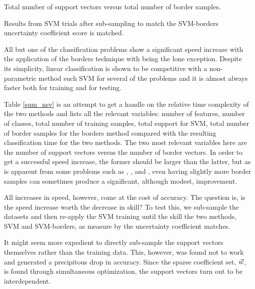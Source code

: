\label{discussion}

\begin{table}
	\caption{Total number of support vectors versus total number of border samples.}
	
	\label{sum_nsv}
\end{table}

\begin{table}
  \caption{Results from SVM trials after sub-sampling to match the SVM-borders
	  uncertainty coefficient score is matched.}
  \label{subsampling_table}
  {\small
    
  }
\end{table}

All but one of the classification problems show a significant speed increase with the application
of the borders technique with  being the lone exception.
Despite its simplicity, linear classification is shown to be competitive with
a non-parametric method such SVM for several of the problems and it is almost 
always faster both for training and for testing.

Table \ref{sum_nsv} is an attempt to get a handle on the relative time complexity 
of the two methods and lists all the relevant variables: number of features,
number of classes, total number of training samples, total support for SVM,
total number of border samples for the borders method compared with the resulting
classification time for the two methods. The two most relevant variables here are the
number of support vectors versus the number of border vectors.
In order to get a successful speed increase, the former should be larger than 
the latter, but as is apparent from some problems such as , , and ,
even having slightly more border samples can sometimes produce a significant,
although modest, improvement.

All increases in speed, however, come at the cost of accuracy.
The question is, is the speed increase worth the decrease in skill?
To test this, we sub-sample the datasets and then re-apply the SVM training
until the skill the two methods, SVM and SVM-borders, as measure by
the uncertainty coefficient matches.

It might seem more expedient to directly sub-sample the support vectors themselves
rather than the training data.
This, however, was found not to work and generated a precipitous drop in accuracy. 
Since the sparse coefficient set, $\vec {w}$, is found through simultaneous 
optimization, the support vectors turn out to be interdependent.


